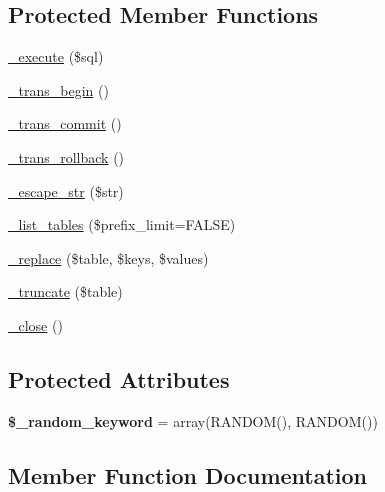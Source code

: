 \subsection*{Protected Member Functions}
\begin{DoxyCompactItemize}
\item 
\mbox{\hyperlink{class_c_i___d_b__sqlite3__driver_a7ee5c04650ffef3b87ce30196f71fd3f}{\+\_\+execute}} (\$sql)
\item 
\mbox{\hyperlink{class_c_i___d_b__sqlite3__driver_a8fcd262d7fba890da5175ce321745efd}{\+\_\+trans\+\_\+begin}} ()
\item 
\mbox{\hyperlink{class_c_i___d_b__sqlite3__driver_a3f1a16f370f8bb7637c3e6bc58e65db2}{\+\_\+trans\+\_\+commit}} ()
\item 
\mbox{\hyperlink{class_c_i___d_b__sqlite3__driver_a6e83049553944a138550b562e06ef516}{\+\_\+trans\+\_\+rollback}} ()
\item 
\mbox{\hyperlink{class_c_i___d_b__sqlite3__driver_aee732d6acfb12f6c85fb14ee0e3f20d0}{\+\_\+escape\+\_\+str}} (\$str)
\item 
\mbox{\hyperlink{class_c_i___d_b__sqlite3__driver_a27971cc990c48ef87823409ec0e1df51}{\+\_\+list\+\_\+tables}} (\$prefix\+\_\+limit=F\+A\+L\+SE)
\item 
\mbox{\hyperlink{class_c_i___d_b__sqlite3__driver_a16979e79732105ac74870f5a81e37fad}{\+\_\+replace}} (\$table, \$keys, \$values)
\item 
\mbox{\hyperlink{class_c_i___d_b__sqlite3__driver_a5990cfd28a8c3500de04529363a99455}{\+\_\+truncate}} (\$table)
\item 
\mbox{\hyperlink{class_c_i___d_b__sqlite3__driver_ae8c47ec0252d74d2905b561886ec2ba0}{\+\_\+close}} ()
\end{DoxyCompactItemize}
\subsection*{Protected Attributes}
\begin{DoxyCompactItemize}
\item 
\mbox{\label{class_c_i___d_b__sqlite3__driver_ac0a0d872e384f4bd3f152263753bd28f}} 
{\bfseries \$\+\_\+random\+\_\+keyword} = array(\textquotesingle{}R\+A\+N\+D\+OM()\textquotesingle{}, \textquotesingle{}R\+A\+N\+D\+OM()\textquotesingle{})
\end{DoxyCompactItemize}


\subsection{Member Function Documentation}
\mbox{\label{class_c_i___d_b__sqlite3__driver_ae8c47ec0252d74d2905b561886ec2ba0}} 
